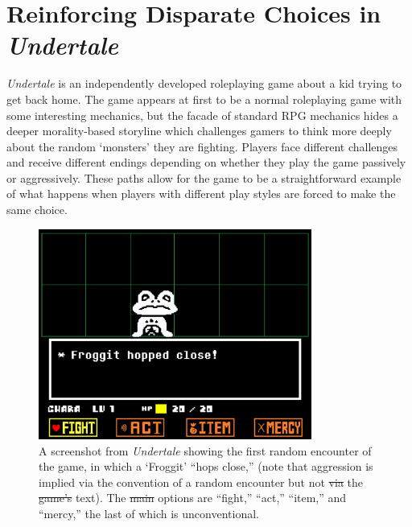 \documentclass[arts,article,submit,moreauthors,pdftex,10pt,a4paper]{Definitions/mdpi}
\providecommand{\DIFadd}[1]{{\protect\color{blue}\uwave{#1}}} %
\providecommand{\DIFdel}[1]{{\protect\color{red}\sout{#1}}}                      %
\providecommand{\DIFdelend}{} %
\providecommand{\DIFaddFL}[1]{\DIFadd{#1}} %
\providecommand{\DIFdelFL}[1]{\DIFdel{#1}} %
\providecommand{\DIFaddbeginFL}{} %
\providecommand{\DIFaddendFL}{} %
\providecommand{\DIFdelbeginFL}{} %
\providecommand{\DIFdelendFL}{} %
\begin{document}
\DIFdelend \section{Reinforcing Disparate Choices in \emph{Undertale}}

\emph{Undertale} is an independently developed roleplaying game \citep{fox2015undertale} about a kid trying to get back home.
%
The game appears at first to be a normal roleplaying game with some interesting mechanics, but the facade of standard RPG mechanics hides a deeper morality-based storyline which challenges gamers to think more deeply about the random `monsters' they are fighting.
%
Players face different challenges and receive different endings depending on whether they play the game passively or aggressively.
%
These paths allow for the game to be a straightforward example of what happens when players with different play styles are forced to make the same choice.

\begin{figure}[t]
  \centering
    \includegraphics[width=0.8\textwidth]{fig/froggit.png}
    \caption{A screenshot from \emph{Undertale} showing the first random encounter of the game, in which a `Froggit' ``hops close,'' (note that aggression is implied via the convention of a random encounter but not \DIFdelbeginFL \DIFdelFL{via }\DIFdelendFL \DIFaddbeginFL \DIFaddFL{by }\DIFaddendFL the \DIFdelbeginFL \DIFdelFL{game's }\DIFdelendFL text). The \DIFdelbeginFL \DIFdelFL{main }\DIFdelendFL options are ``fight,'' ``act,'' ``item,'' and ``mercy,'' the last of which is unconventional.}
    \label{fig:UT_froggit}
\end{figure}
\end{document}
